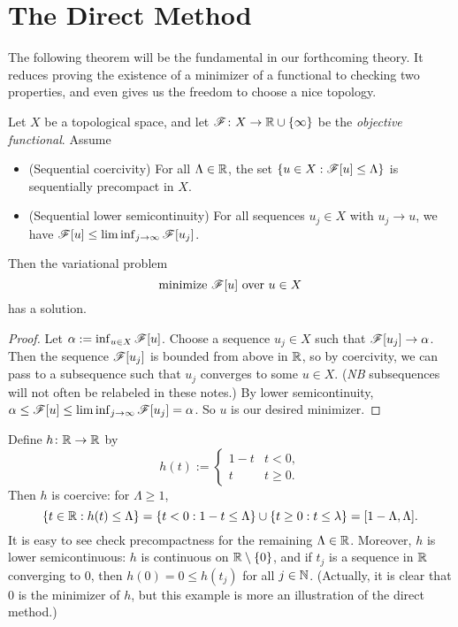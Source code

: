 
\section{The Direct Method}
The following theorem will be the fundamental in our forthcoming theory. It reduces proving the existence of a minimizer of a functional to checking two properties, and even gives us the freedom to choose a nice topology.
\begin{theorem}
    Let $X$ be a topological space, and let $\mathscr{F} \colon X \to \mathbb{R} \cup \left\{ {\infty} \right\}$ be the \textit{objective functional}. Assume
    \begin{itemize}
        \item (Sequential coercivity) For all $\Lambda \in \mathbb{R}$, the set $\left\{ {u \in X : \mathscr{F}[u] \leq \Lambda} \right\}$ is sequentially precompact in $X$.
        \item (Sequential lower semicontinuity) For all sequences $u_j \in X$ with $u_j \rightarrow u$, we have $\mathscr{F}[u] \leq \liminf_{j\rightarrow \infty} \mathscr{F}[u_j]$.
    \end{itemize}
    Then the variational problem
    \begin{equation}
        \text{minimize } \mathscr{F}[u] \text{ over } u \in X
    \end{equation}
    has a solution.
\end{theorem}
\begin{proof}
    Let $\alpha := \inf_{u \in X} \mathscr{F}[u]$. Choose a sequence $u_j \in X$ such that $\mathscr{F}[u_j] \rightarrow \alpha$. Then the sequence $\mathscr{F}[u_j]$ is bounded from above in $\mathbb{R}$, so by coercivity, we can pass to a subsequence such that $u_j$ converges to some $u \in X$. (\textit{NB} subsequences will not often be relabeled in these notes.) By lower semicontinuity, $\alpha \leq \mathscr{F}[u] \leq \liminf_{j \rightarrow \infty} \mathscr{F}[u_j] = \alpha$. So $u$ is our desired minimizer.
\end{proof}
\begin{example}
    Define $h \colon \mathbb{R} \to \mathbb{R}$ by 
    \begin{equation}
        h(t) :=
        \begin{cases}
            1-t & t < 0,    \\
            t   & t \geq 0.
        \end{cases}
    \end{equation}
    Then $h$ is coercive: for $\Lambda \geq 1$,
    \begin{equation}
        \left\{ {t \in \mathbb{R} : h(t) \leq \Lambda} \right\} = \left\{ {t < 0 : 1-t \leq \Lambda} \right\} \cup \left\{ {t \geq 0 : t \leq \lambda} \right\} 
                                             = [1-\Lambda,\Lambda].
    \end{equation}
    It is easy to see check precompactness for the remaining $\Lambda \in \mathbb{R}$. Moreover, $h$ is lower semicontinuous: $h$ is continuous on $\mathbb{R} \setminus \left\{ {0} \right\}$, and if $t_j$ is a sequence in $\mathbb{R}$ converging to $0$, then $h(0) = 0 \leq h(t_j)$ for all $j \in \mathbb{N}$. (Actually, it is clear that $0$ is the minimizer of $h$, but this example is more an illustration of the direct method.)
\end{example}
